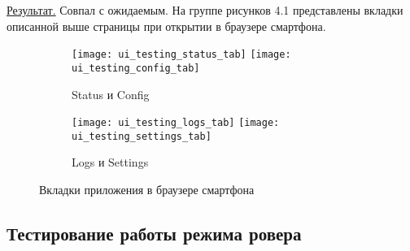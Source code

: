 \underline{Результат.} Совпал с ожидаемым. На группе рисунков 4.1 представлены вкладки описанной выше страницы при открытии в браузере смартфона.

\begin{figure}
  \label{img:latex}
  \begin{subfigure}{\linewidth}
    \center
    \texttt{[image: ui\_testing\_status\_tab]}
    \texttt{[image: ui\_testing\_config\_tab]}
    \caption{Status и Config}
  \end{subfigure}\par\medskip
  \begin{subfigure}{\linewidth}
    \center
    \texttt{[image: ui\_testing\_logs\_tab]}
    \texttt{[image: ui\_testing\_settings\_tab]}
    \caption{Logs и Settings}
  \end{subfigure}\par\medskip
  \caption{Вкладки приложения в браузере смартфона}
\end{figure}

\subsection{Тестирование работы режима ровера} \label{subsect4_2_1}

















